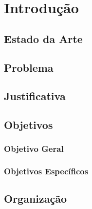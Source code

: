 \chapter{Introdução}

\section{Estado da Arte}

\section{Problema}

\section{Justificativa}

\section{Objetivos}

\subsection{Objetivo Geral}

\subsection{Objetivos Específicos}


\section{Organização}



